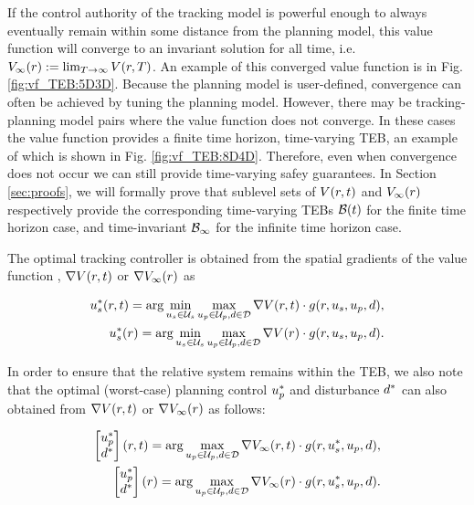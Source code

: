 If the control authority of the tracking model is powerful enough to always eventually remain within some distance from the planning model, this value function will converge to an invariant solution for all time, i.e. $V_\infty(r) := \lim_{T\rightarrow\infty} V(r, T)$. 
An example of this converged value function is in Fig. \ref{fig:vf_TEB:5D3D}. 
Because the planning model is user-defined, convergence can often be achieved by tuning the planning model.  However, there may be tracking-planning model pairs where the value function does not converge.  
In these cases the value function provides a finite time horizon, time-varying TEB, an example of which is shown in Fig. \ref{fig:vf_TEB:8D4D}.
Therefore, even when convergence does not occur we can still provide time-varying safey guarantees.
In Section \ref{sec:proofs}, we will formally prove that sublevel sets of $V(r,t)$ and $V_\infty(r)$ respectively provide the corresponding time-varying TEBs $\mathcal B(t)$ for the finite time horizon case, and time-invariant $\mathcal B_\infty$ for the infinite time horizon case.
 
The optimal tracking controller is obtained from the spatial gradients of the value function \cite{Mitchell05, Fisac15, Chen2018}, $\nabla V(r, t)$ or $\nabla V_\infty(r)$ as

\begin{subequations} \label{eq:opt_ctrl}
  \begin{align}
  \tctrl^*(\rstate, \tvar) = \arg\min_{\tctrl\in\tcset} \max_{\pctrl\in\pcset, \dstb\in\dset} \nabla\valfunc(\rstate, \tvar) \cdot \rdyn(\rstate,\tctrl,\pctrl,\dstb), \label{eq:opt_ctrl_fin}\\
  \tctrl^*(\rstate) = \arg\min_{\tctrl\in\tcset} \max_{\pctrl\in\pcset, \dstb\in\dset} \nabla\valfunc(\rstate) \cdot \rdyn(\rstate,\tctrl,\pctrl,\dstb). \label{eq:opt_ctrl_inf}
  \end{align}
\end{subequations}

In order to ensure that the relative system remains within the TEB, we also note that the optimal (worst-case) planning control $u_p^*$ and disturbance $d^*$ can also obtained from $\nabla V(r, t)$ or $\nabla V_\infty(r)$ as follows:

\begin{subequations} \label{eq:opt_dstb}
  \begin{align}
  \begin{bmatrix}
    u_p^* \\
    d^*
  \end{bmatrix} (r, t) = \arg \max_{u_p\in\mathcal{U}_p, d\in\mathcal{D}} \nabla V_\infty(r, t) \cdot g(r,u_s^*,u_p,d), \\
  \begin{bmatrix}
    u_p^* \\
    d^*
  \end{bmatrix}(r) = \arg \max_{u_p\in\mathcal{U}_p, d\in\mathcal{D}} \nabla V_\infty(r) \cdot g(r,u_s^*,u_p,d). 
  \end{align}
\end{subequations}

